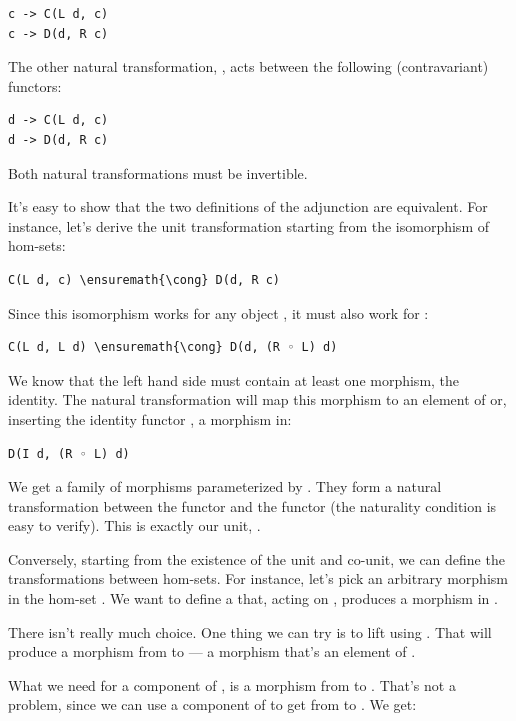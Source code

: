 \begin{verbatim}
c -> C(L d, c)
c -> D(d, R c)
\end{verbatim}
The other natural transformation, , acts between the following
(contravariant) functors:

\begin{verbatim}
d -> C(L d, c)
d -> D(d, R c)
\end{verbatim}
Both natural transformations must be invertible.

It's easy to show that the two definitions of the adjunction are
equivalent. For instance, let's derive the unit transformation starting
from the isomorphism of hom-sets:

\begin{Verbatim}[commandchars=\\\{\}]
C(L d, c) \ensuremath{\cong} D(d, R c)
\end{Verbatim}
Since this isomorphism works for any object , it must also
work for :

\begin{Verbatim}[commandchars=\\\{\}]
C(L d, L d) \ensuremath{\cong} D(d, (R ◦ L) d)
\end{Verbatim}
We know that the left hand side must contain at least one morphism, the
identity. The natural transformation will map this morphism to an
element of  or, inserting the identity
functor , a morphism in:

\begin{verbatim}
D(I d, (R ◦ L) d)
\end{verbatim}
We get a family of morphisms parameterized by . They form a
natural transformation between the functor  and the functor
 (the naturality condition is easy to verify). This is
exactly our unit, .

Conversely, starting from the existence of the unit and co-unit, we can
define the transformations between hom-sets. For instance, let's pick an
arbitrary morphism  in the hom-set . We
want to define a  that, acting on , produces a
morphism in .

There isn't really much choice. One thing we can try is to lift
 using . That will produce a morphism 
from  to  --- a morphism that's an
element of .

What we need for a component of , is a morphism from
 to . That's not a problem, since we can use a
component of  to get from  to
. We get:

